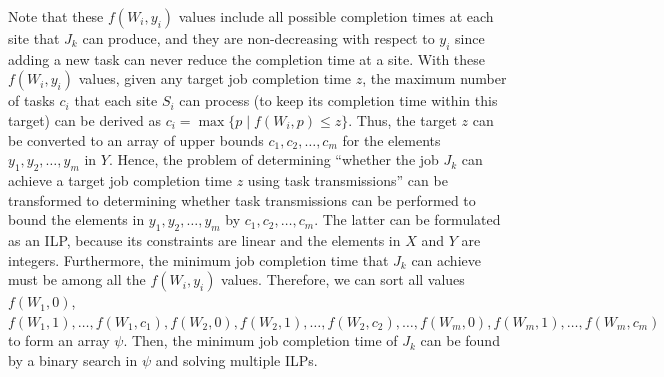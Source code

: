 Note that these $f(W_i, y_i)$ values include all possible completion times at each site that $J_k$ can produce, and they are non-decreasing with respect to $y_i$ since adding a new task can never reduce the completion time at a site. With these $f(W_i, y_i)$ values, given any target job completion time $z$, the maximum number of tasks $c_i$ that each site $S_i$ can process (to keep its completion time within this target) can be derived as $c_i = \max\{p \mid f(W_i, p)\leq z\}$. Thus, the target $z$ can be converted to an array of upper bounds $c_1, c_2, \dots, c_m$ for the elements $y_1, y_2, \dots, y_m$ in $Y$. Hence, the problem of determining ``whether the job $J_k$ can achieve a target job completion time $z$ using task transmissions'' can be transformed to determining whether task transmissions can be performed to bound the elements in $y_1, y_2, \dots, y_m$ by $c_1, c_2, \dots, c_m$. The latter can be formulated as an ILP, because its constraints are linear and the elements in $X$ and $Y$ are integers. Furthermore, the minimum job completion time that $J_k$ can achieve must be among all the $f(W_i, y_i)$ values. Therefore, we can sort all values $f(W_1, 0)$, \allowbreak $f(W_1, 1), \allowbreak \dots, \allowbreak f(W_1, c_1), \allowbreak f(W_2, 0), \allowbreak f(W_2, 1), \allowbreak \dots, \allowbreak f(W_2, c_2), \allowbreak \dots, \allowbreak f(W_m, 0), \allowbreak f(W_m, 1), \allowbreak \dots, \allowbreak f(W_m, c_m)$ to form an array $\psi$. Then, the minimum job completion time of $J_k$ can be found by a binary search in $\psi$ and solving multiple ILPs.

